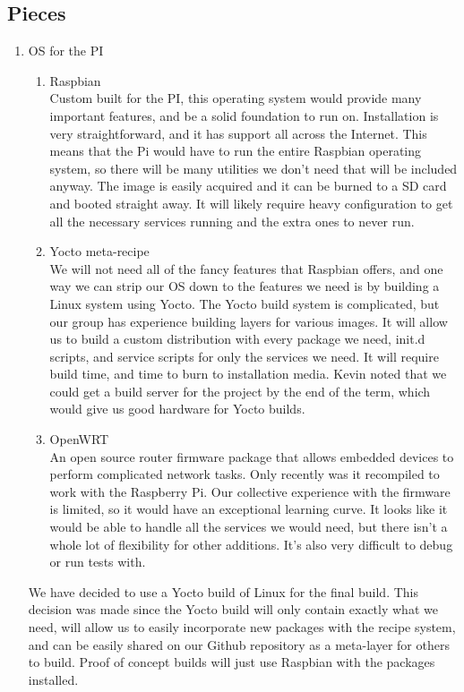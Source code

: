 \subsection{Pieces}

\begin{enumerate}
    \item OS for the PI
        \begin{enumerate}
            \item Raspbian \\
                Custom built for the PI, this operating system would provide many important features, and be a solid foundation to run on. Installation is very straightforward, and it has support all across the Internet. This means that the Pi would have to run the entire Raspbian operating system, so there will be many utilities we don't need that will be included anyway. The image is easily acquired and it can be burned to a SD card and booted straight away. It will likely require heavy configuration to get all the necessary services running and the extra ones to never run.
            \item Yocto meta-recipe \\
                We will not need all of the fancy features that Raspbian offers, and one way we can strip our OS down to the features we need is by building a Linux system using Yocto. The Yocto build system is complicated, but our group has experience building layers for various images. It will allow us to build a custom distribution with every package we need, init.d scripts, and service scripts for only the services we need. It will require build time, and time to burn to installation media. Kevin noted that we could get a build server for the project by the end of the term, which would give us good hardware for Yocto builds. 
            \item OpenWRT \\
                An open source router firmware package that allows embedded devices to perform complicated network tasks. Only recently was it recompiled to work with the Raspberry Pi. Our collective experience with the firmware is limited, so it would have an exceptional learning curve. It looks like it would be able to handle all the services we would need, but there isn't a whole lot of flexibility for other additions. It's also very difficult to debug or run tests with. 
        \end{enumerate}
        We have decided to use a Yocto build of Linux for the final build. This decision was made since the Yocto build will only contain exactly what we need, will allow us to easily incorporate new packages with the recipe system, and can be easily shared on our Github repository as a meta-layer for others to build. Proof of concept builds will just use Raspbian with the packages installed.

\end{enumerate}
